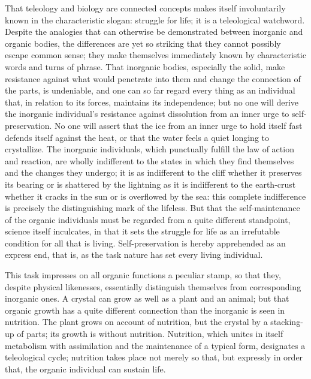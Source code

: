 \documentclass[12pt]{book}
\begin{document}
That teleology and biology are connected concepts makes itself involuntarily known in the
characteristic slogan: struggle for life; it is a teleological watchword. Despite the
analogies that can otherwise be demonstrated between inorganic and organic bodies, the
differences are yet so striking that they cannot possibly escape common sense; they make
themselves immediately known by characteristic words and turns of phrase. That inorganic
bodies, especially the solid, make resistance against what would penetrate into them and
change the connection of the parts, is undeniable, and one can so far regard every thing
as an individual that, in relation to its forces, maintains its independence; but no one
will derive the inorganic individual's resistance against dissolution from an inner urge to
self-preservation. No one will assert that the ice from an inner urge to hold itself fast
defends itself against the heat, or that the water feels a quiet longing to crystallize.
The inorganic individuals, which punctually fulfill the law of action and reaction, are
wholly indifferent to the states in which they find themselves and the changes they
undergo; it is as indifferent to the cliff whether it preserves its bearing or is
shattered by the lightning as it is indifferent to the earth-crust whether it cracks in
the sun or is overflowed by the sea: this complete indifference is precisely the
distinguishing mark of the lifeless. But that the self-maintenance of the organic
individuals must be regarded from a quite different standpoint, science itself inculcates,
in that it sets the struggle for life as an irrefutable condition for all that is living.
Self-preservation is hereby apprehended as an express end, that is, as the task nature has
set every living individual.

This task impresses on all organic functions a peculiar stamp, so that they, despite
physical likenesses, essentially distinguish themselves from corresponding inorganic ones.
A crystal can grow as well as a plant and an animal; but that organic growth has a quite
different connection than the inorganic is seen in nutrition. The plant grows on account of
nutrition, but the crystal by a stacking-up of parts; its growth is without nutrition.
Nutrition, which unites in itself metabolism with assimilation and the maintenance of a
typical form, designates a teleological cycle; nutrition takes place not merely so that,
but expressly in order that, the organic individual can sustain life.
\end{document}
